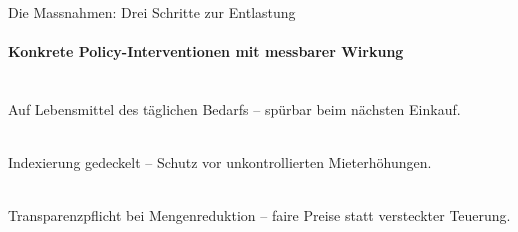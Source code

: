 \documentclass[aspectratio=169, 11pt, xcolor={table}]{beamer}
\begin{document}
\begin{frame}[shrink=5]{Die Massnahmen: Drei Schritte zur Entlastung}
\framesubtitle{Konkrete Policy-Interventionen mit messbarer Wirkung}

\vskip2pt

\\[1pt]
{\small\color{famedgray}\hspace{1cm} Auf Lebensmittel des t\"aglichen Bedarfs -- sp\"urbar beim n\"achsten Einkauf.}

\vskip8pt

\\[1pt]
{\small\color{famedgray}\hspace{1cm} Indexierung gedeckelt -- Schutz vor unkontrollierten Mieterh\"ohungen.}

\vskip8pt

\\[1pt]
{\small\color{famedgray}\hspace{1cm} Transparenzpflicht bei Mengenreduktion -- faire Preise statt versteckter Teuerung.}

\vskip6pt


\end{frame}

\end{document}
